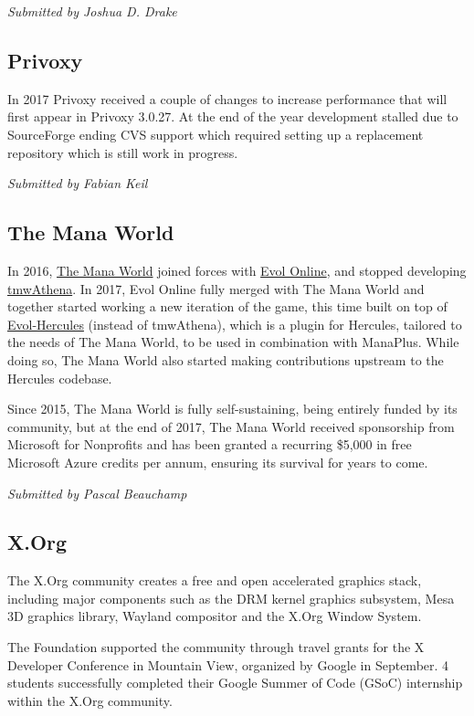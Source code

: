\documentclass[a4paper]{report}
\begin{document}
{\em Submitted by Joshua D. Drake}

\subsection{Privoxy}

In 2017 Privoxy received a couple of changes to increase performance
that will first appear in Privoxy 3.0.27.  At the end of the year
development stalled due to SourceForge ending CVS support which required
setting up a replacement repository which is still work in progress.

{\em Submitted by Fabian Keil}

\subsection{The Mana World}

In 2016, \href{https://www.themanaworld.org/}{The Mana World} joined
forces with \href{https://evolonline.org/}{Evol Online}, and stopped
developing \href{https://github.com/themanaworld/tmwa}{tmwAthena}.  In
2017, Evol Online fully merged with The Mana World and together started
working a new iteration of the game, this time built on top of
\href{https://gitlab.com/evol/evol-hercules}{Evol-Hercules} (instead of
tmwAthena), which is a plugin for Hercules, tailored to the needs of The
Mana World, to be used in combination with ManaPlus. While doing so, The
Mana World also started making contributions upstream to the Hercules
codebase.

Since 2015, The Mana World is fully self-sustaining, being entirely
funded by its community, but at the end of 2017, The Mana World received
sponsorship from Microsoft for Nonprofits and has been granted a
recurring \$5,000 in free Microsoft Azure credits per annum, ensuring
its survival for years to come.

{\em Submitted by Pascal Beauchamp}

\subsection{X.Org}

The X.Org community creates a free and open accelerated graphics stack,
including major components such as the DRM kernel graphics subsystem,
Mesa 3D graphics library, Wayland compositor and the X.Org Window
System.

The Foundation supported the community through travel grants for the X
Developer Conference in Mountain View, organized by Google in September.
4 students successfully completed their Google Summer of Code (GSoC)
internship within the X.Org community.
\end{document}
